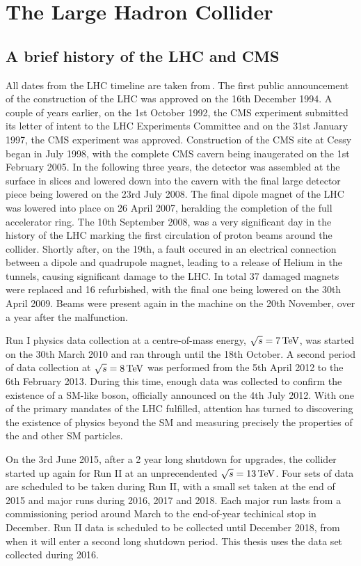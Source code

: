 \section{The Large Hadron Collider}
\label{sec:LHC}

\subsection{A brief history of the LHC and CMS}
\label{ssec:LHCHist}
All dates from the LHC timeline are taken from\,\cite{LHCtimeline}.
The first public announcement of the construction of the LHC was approved on the 16th December 1994. 
A couple of years earlier, on the 1st October 1992, the CMS experiment submitted its letter of intent to the LHC Experiments Committee and on the 31st January 1997, the CMS experiment was approved.
Construction of the CMS site at Cessy began in July 1998, with the complete CMS cavern being inaugerated on the 1st February 2005.
In the following three years, the detector was assembled at the surface in slices and lowered down into the cavern with the final large detector piece being lowered on the 23rd July 2008.
The final dipole magnet of the LHC was lowered into place on 26 April 2007, heralding the completion of the full accelerator ring.
The 10th September 2008, was a very significant day in the history of the LHC marking the first circulation of proton beams around the collider. 
Shortly after, on the 19th, a fault occured in an electrical connection between a dipole and quadrupole magnet, leading to a release of Helium in the tunnels, causing significant damage to the LHC. 
In total 37 damaged magnets were replaced and 16 refurbished, with the final one being lowered on the 30th April 2009. 
Beams were present again in the machine on the 20th November, over a year after the malfunction. 

Run I physics data collection at a centre-of-mass energy, $\sqrt{s}=7\,\text{Te\hspace{-.08em}V}$, was started on the 30th March 2010 and ran through until the 18th October. 
A second period of data collection at $\sqrt{s}=8\,\text{Te\hspace{-.08em}V}$ was performed from the 5th April 2012 to the 6th February 2013. 
During this time, enough data was collected to confirm the existence of a SM-like \Hboson{} boson, officially announced on the 4th July 2012.
With one of the primary mandates of the LHC fulfilled, attention has turned to discovering the existence of physics beyond the SM and measuring precisely the properties of the \Hboson{} and other SM particles.

On the 3rd June 2015, after a 2 year long shutdown for upgrades, the collider started up again for Run II at an unprecendented $\sqrt{s}=13\,\text{Te\hspace{-.08em}V}$. 
Four sets of data are scheduled to be taken during Run II, with a small set taken at the end of 2015 and major runs during 2016, 2017 and 2018.
Each major run lasts from a commissioning period around March to the end-of-year techinical stop in December.
Run II data is scheduled to be collected until December 2018, from when it will enter a second long shutdown period.
This thesis uses the data set collected during 2016.

